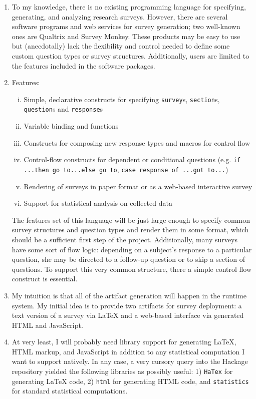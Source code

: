 \documentclass[12pt]{article}
\begin{document}
\begin{enumerate}[1)]
\item To my knowledge, there is no existing programming language for specifying,
generating, and analyzing research surveys. However, there are several software 
programs and web services for survey generation; two well-known ones are 
Qualtrix and Survey Monkey. These products may be easy to use but (anecdotally) lack the
flexibility and control needed to define some custom question types or survey 
structures. Additionally, users are limited to the features included in the 
software packages.

\item Features: 
\begin{enumerate}[i)]
\item Simple, declarative constructs for specifying \texttt{survey}s, \texttt{section}s, 
\texttt{question}s and \texttt{response}s
\item Variable binding and functions
\item Constructs for composing new response types and macros for control flow
\item Control-flow constructs for dependent or conditional questions (e.g. \texttt{if ...then go to...else go to},
\texttt{case response of ...got to...})
\item Rendering of surveys in paper format or as a web-based interactive survey
\item Support for statistical analysis on collected data
\end{enumerate}

The features set of this language will be just large enough to specify common 
survey structures and question types and render them in some format, which 
should be a sufficient first step of the project. Additionally, many surveys 
have some sort of flow logic: depending on a subject's response to a particular 
question, she may be directed to a follow-up question or to skip a section of questions. 
To support this very common structure, there a simple control flow construct is essential.

\item My intuition is that all of the artifact generation will happen in the  
runtime system. My initial idea is to provide two artifacts for survey deployment: a 
text version of a survey via LaTeX and a web-based interface via generated 
HTML and JavaScript.

\item At very least, I will probably need library support for generating 
LaTeX, HTML markup, and JavaScript in addition to any statistical computation I 
want to support natively. In any case, a very cursory query into the Hackage
repository yielded the following libraries as possibly useful: 1) \texttt{HaTex} for 
generating LaTeX code, 2) \texttt{html} for generating HTML code, and 
\texttt{statistics} for standard statistical computations.


\end{enumerate}
\end{document}
